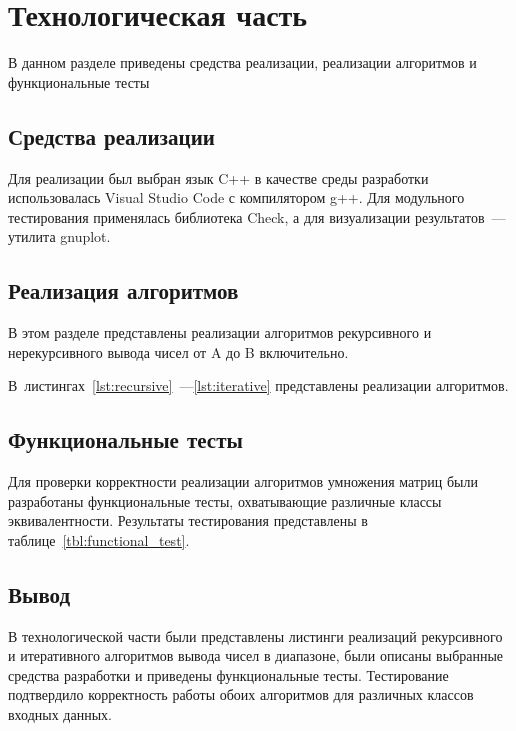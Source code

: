 \chapter{Технологическая часть}

В данном разделе приведены средства реализации, реализации алгоритмов и функциональные тесты

\section{Средства реализации}
Для реализации был выбран язык C++ в качестве среды разработки использовалась Visual Studio Code с компилятором g++. Для модульного тестирования применялась библиотека Check, а для визуализации результатов~---утилита gnuplot.

\section{Реализация алгоритмов}
В этом разделе представлены реализации алгоритмов рекурсивного и нерекурсивного вывода чисел от A до B включительно.

В~листингах~\ref{lst:recursive}~---\ref{lst:iterative} представлены реализации алгоритмов.

\section{Функциональные тесты}

Для проверки корректности реализации алгоритмов умножения матриц были разработаны функциональные тесты, охватывающие различные классы эквивалентности. Результаты тестирования представлены в таблице~\ref{tbl:functional_test}.



\section*{Вывод}

В технологической части были представлены листинги реализаций рекурсивного и итеративного алгоритмов вывода чисел в диапазоне, были описаны выбранные средства разработки и приведены функциональные тесты. Тестирование подтвердило корректность работы обоих алгоритмов для различных классов входных данных.


\clearpage
